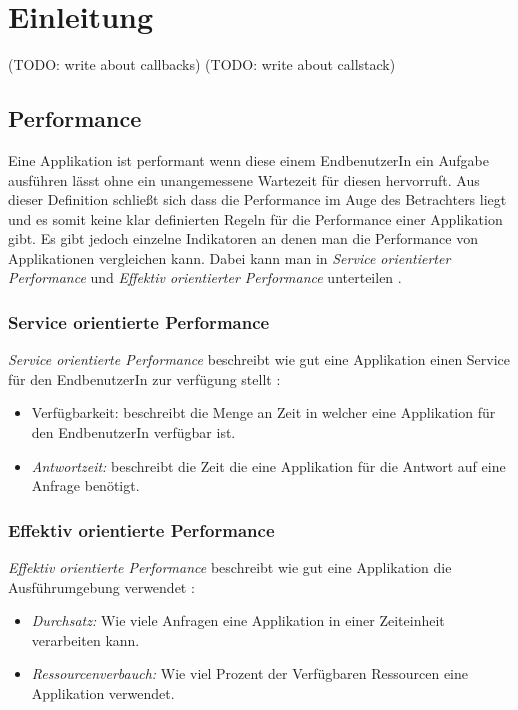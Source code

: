 \section{Einleitung}
\label{section:Einleitung}


(TODO: write about callbacks)
(TODO: write about callstack)

\subsection{Performance}

Eine Applikation ist performant wenn diese einem EndbenutzerIn ein Aufgabe ausführen lässt ohne ein unangemessene Wartezeit für diesen hervorruft. Aus dieser Definition schließt sich dass die Performance im Auge des Betrachters liegt und es somit keine klar definierten Regeln für die Performance einer Applikation gibt. Es gibt jedoch einzelne Indikatoren an denen man die Performance von Applikationen vergleichen kann. Dabei kann man in \emph{Service orientierter Performance} und \emph{Effektiv orientierter Performance} unterteilen \cite[p. 2]{Mol2009}.

\subsubsection{Service orientierte Performance}

\emph{Service orientierte Performance} beschreibt wie gut eine Applikation einen Service für den EndbenutzerIn zur verfügung stellt \cite[p. 2]{Mol2009}:

\begin{itemize}
  \item {Verfügbarkeit:} beschreibt die Menge an Zeit in welcher eine Applikation für den EndbenutzerIn verfügbar ist.
  \item \emph{Antwortzeit:} beschreibt die Zeit die eine Applikation für die Antwort auf eine Anfrage benötigt.
\end{itemize}


\subsubsection{Effektiv orientierte Performance}

\emph{Effektiv orientierte Performance} beschreibt wie gut eine Applikation die Ausführumgebung verwendet \cite[p. 2]{Mol2009}:

\begin{itemize}
  \item \emph{Durchsatz:} Wie viele Anfragen eine Applikation in einer Zeiteinheit verarbeiten kann.
  \item \emph{Ressourcenverbauch:} Wie viel Prozent der Verfügbaren Ressourcen eine Applikation verwendet.
\end{itemize}

